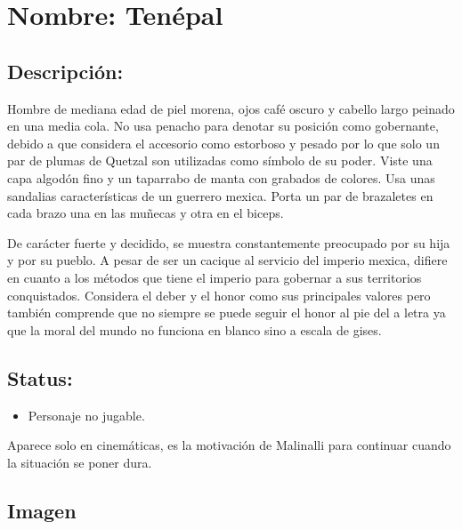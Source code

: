 \section{Nombre: Tenépal}  \label{per:tenepal}
\subsection{Descripción:}   
Hombre de mediana edad de piel morena, ojos café oscuro y cabello largo peinado en una media cola. No usa penacho para denotar su posición como gobernante, debido a que considera el accesorio como estorboso y pesado por lo que solo un par de plumas de Quetzal son utilizadas como símbolo de su poder. Viste una capa algodón fino y un taparrabo de manta con grabados de colores. Usa unas sandalias características de un guerrero mexica. Porta un par de brazaletes en cada brazo una en las muñecas y otra en el biceps.
\\
\par
De carácter fuerte y decidido, se muestra constantemente preocupado por su hija y por su pueblo. A pesar de ser un cacique al servicio del imperio mexica, difiere en cuanto a los métodos que tiene el imperio para gobernar a sus territorios conquistados. Considera el deber y el honor como sus principales valores pero también comprende que no siempre se puede seguir el honor al pie del a letra ya que la moral del mundo no funciona en blanco sino a escala de gises. 
\subsection{Status:}
\begin{itemize}
		\item Personaje no jugable.
	\end{itemize}
Aparece solo en cinemáticas, es la motivación de Malinalli para continuar cuando la situación se poner dura. 
\subsection{Imagen}
